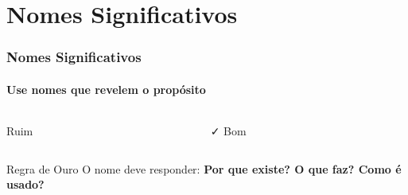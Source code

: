\documentclass[aspectratio=169]{beamer}
\begin{document}

\section{Nomes Significativos}

\begin{frame}
\frametitle{Nomes Significativos}
\framesubtitle{Use nomes que revelem o propósito}

\begin{columns}
\begin{column}{0.5\textwidth}
\begin{block}{\textcolor{cleanred}{\faTimes} Ruim}

\end{block}
\end{column}

\begin{column}{0.5\textwidth}
\begin{block}{\textcolor{cleangreen}{\faCheck} Bom}

\end{block}
\end{column}
\end{columns}

\vspace{0.5cm}
\begin{alertblock}{Regra de Ouro}
\centering
O nome deve responder: \textbf{Por que existe? O que faz? Como é usado?}
\end{alertblock}
\end{frame}
\end{document}

